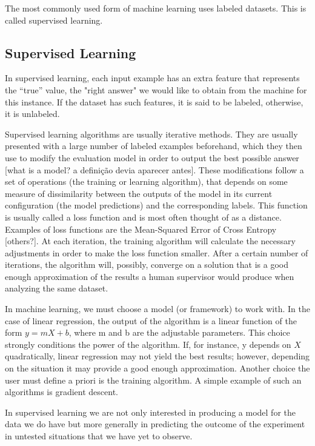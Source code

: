 The most commonly used form of machine learning uses labeled datasets. This is called supervised learning.

\subsection{Supervised Learning}
\label{subsec:supervised-learning}

In supervised learning, each input example has an extra feature that represents the “true” value, the "right answer" we would like to obtain from the machine for this instance. If the dataset has such features, it is said to be labeled, otherwise, it is unlabeled.

Supervised learning algorithms are usually iterative methods. They are usually presented with a large number of labeled examples beforehand, which they then use to modify the evaluation model in order to output the best possible answer [what is a model? a definição devia aparecer antes]. These modifications follow a set of operations (the training or learning algorithm), that depends on some measure of dissimilarity between the outputs of the model in its current configuration (the model predictions) and the corresponding labels. This function is usually called a loss function and is most often thought of as a distance. Examples of loss functions are the Mean-Squared Error of Cross Entropy [others?]. At each iteration, the training algorithm will calculate the necessary adjustments in order to make the loss function smaller. After a certain number of iterations, the algorithm will, possibly, converge on a solution that is a good enough approximation of the results a human supervisor would produce when analyzing the same dataset.

In machine learning, we must choose a model (or framework) to work with. In the case of linear regression, the output of the algorithm is a linear function of the form $y = mX + b$, where m and b are the adjustable parameters. This choice strongly conditions the power of the algorithm. If, for instance, y depends on $X$ quadratically, linear regression may not yield the best results; however, depending on the situation it may provide a good enough approximation.
Another choice the user must define a priori is the training algorithm. A simple example of such an algorithms is gradient descent. 

In supervised learning we are not only interested in producing a model for the data we do have but more generally in predicting the outcome of the experiment in untested situations that we have yet to observe.

